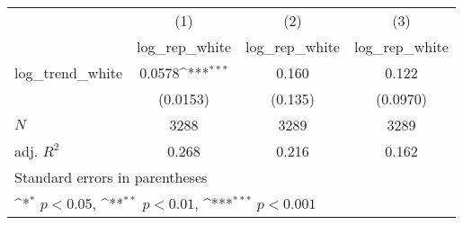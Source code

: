 {
\def\sym#1{\ifmmode^{#1}\else\(^{#1}\)\fi}
\begin{tabular}{l*{3}{c}}
\hline\hline
            &\multicolumn{1}{c}{(1)}&\multicolumn{1}{c}{(2)}&\multicolumn{1}{c}{(3)}\\
            &\multicolumn{1}{c}{log\_rep\_white}&\multicolumn{1}{c}{log\_rep\_white}&\multicolumn{1}{c}{log\_rep\_white}\\
\hline
log\_trend\_white&      0.0578\sym{***}&       0.160         &       0.122         \\
            &    (0.0153)         &     (0.135)         &    (0.0970)         \\
\hline
\(N\)       &        3288         &        3289         &        3289         \\
adj. \(R^{2}\)&       0.268         &       0.216         &       0.162         \\
\hline\hline
\multicolumn{4}{l}{\footnotesize Standard errors in parentheses}\\
\multicolumn{4}{l}{\footnotesize \sym{*} \(p<0.05\), \sym{**} \(p<0.01\), \sym{***} \(p<0.001\)}\\
\end{tabular}
}
